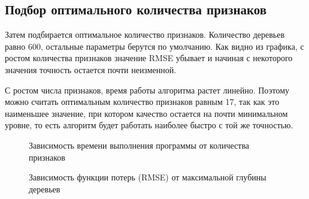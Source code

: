 \documentclass[oneside,final,12pt]{article}
\begin{document}
\subsection {Подбор оптимального количества признаков}
	Затем подбирается оптимальное количество признаков. Количество деревьев равно 600, остальные параметры берутся по умолчанию. Как видно из графика, с ростом количества признаков значение RMSE убывает и начиная с некоторого значения точность остается почти неизменной. 

С ростом числа признаков, время работы алгоритма растет линейно. Поэтому можно считать оптимальным количество признаков равным 17, так как это наименьшее значение, при котором качество остается на почти минимальном уровне, то есть алгоритм будет работать наиболее быстро с той же точностью.
\begin{figure}[h!]
\caption{Зависимость времени выполнения программы от количества признаков}
\label{fig:image4}
\end{figure}
\begin{figure}[h!]
\caption{Зависимость функции потерь (RMSE) от максимальной глубины деревьев}
\label{fig:image5}
\end{figure}
\end{document}
